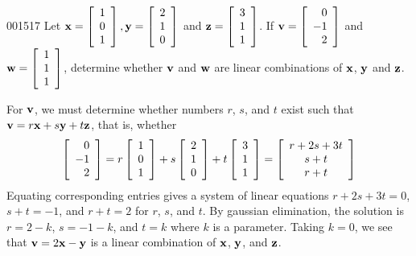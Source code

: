 \begin{example}{}{001517}
Let $ \textbf{x} = 
\left[ \begin{array}{r}
	1 \\
	0 \\
	1
\end{array} \right], \textbf{y} = 
\left[ \begin{array}{r}
	2 \\
	1 \\
	0
\end{array} \right]$
and $\textbf{z} = 
\left[ \begin{array}{r}
	3 \\
	1 \\
	1
\end{array} \right]$.  If $\textbf{v} = 
\left[ \begin{array}{r}
	0 \\
	-1 \\
	2
\end{array} \right]$
 and $\textbf{w} = 
\left[ \begin{array}{r}
	1 \\
	1 \\
	1
\end{array} \right]$,
determine whether $\textbf{v}$ and $\textbf{w}$ are linear combinations of $\textbf{x}$, $\textbf{y}$ and $\textbf{z}$.

\begin{solution}
For $\textbf{v}$, we must determine whether numbers $r$, $s$, and $t$ exist such that $\textbf{v} = r\textbf{x} + s\textbf{y} + t\textbf{z}$, that is, whether
\begin{equation*}
\left[ \begin{array}{r}
	0 \\
	-1 \\
	2
\end{array} \right]
= r
\left[ \begin{array}{r}
	1 \\
	0 \\
	1
\end{array} \right]
+ s
\left[ \begin{array}{r}
	2 \\
	1 \\
	0
\end{array} \right]
+ t
\left[ \begin{array}{r}
	3 \\
	1 \\
	1
\end{array} \right]
=
\left[ \begin{array}{c}
	r + 2s + 3t \\
	s + t \\
	r + t
\end{array} \right]
\end{equation*}
Equating corresponding entries gives a system of linear equations $r + 2s + 3t = 0$, $s + t = -1$, and $r + t = 2$ for $r$, $s$, and $t$. By gaussian elimination, the solution is $r = 2 - k$, $s = -1 - k$, and $t = k$ where $k$ is a parameter. Taking $k = 0$, we see that $\textbf{v} = 2\textbf{x} - \textbf{y}$ is a linear combination of $\textbf{x}$, $\textbf{y}$, and $\textbf{z}$.


\end{solution}
\end{example}
